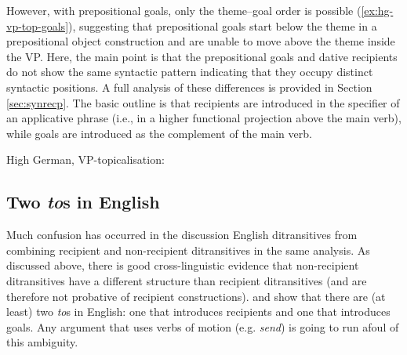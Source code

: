 	However, with prepositional goals, only the theme--goal order is possible (\ref{ex:hg-vp-top-goals}), suggesting that prepositional goals start below the theme in a prepositional object construction and are unable to move above the theme inside the VP. Here, the main point is that the prepositional goals and dative recipients do not show the same syntactic pattern indicating that they occupy distinct syntactic positions. A full analysis of these differences is provided in Section \ref{sec:synrecp}. The basic outline is that recipients are introduced in the specifier of an applicative phrase (i.e., in a higher functional projection above the main verb), while goals are introduced as the complement of the main verb. 

	\begin{exe}
		\ex\label{ex:hg-vp-top-goals} High German, VP-topicalisation:
		\begin{xlist}
		\end{xlist}
	\end{exe}

	\subsection{Two \textit{to}s in English}
	Much confusion has occurred in the discussion English ditransitives from combining recipient and non-recipient ditransitives in the same analysis. As discussed above, there is good cross-linguistic evidence that non-recipient ditransitives have a different structure than recipient ditransitives (and are therefore not probative of recipient constructions). \cite{Levinson.2005} and \cite{Hovav.2008} show that there are (at least) two \textit{to}s in English: one that introduces recipients and one that introduces goals. Any argument that uses verbs of motion (e.g. \textit{send}) is going to run afoul of this ambiguity.

